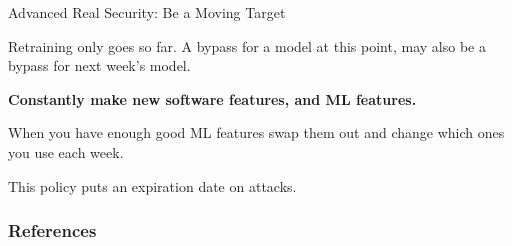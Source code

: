 \documentclass{beamer}
\begin{document}
\begin{frame}{Advanced Real Security: Be a Moving Target}
    \begin{center}
        Retraining only goes so far. A bypass for a model at this point, may also be a bypass for next week's model.
        \vspace{10pt}
        
        \textbf{Constantly make new software features, and ML features.}  
        \vspace{10pt}

        When you have enough good ML features swap them out and change which ones you use each week. 
        \vspace{10pt}
        
        This policy puts an expiration date on attacks. \cite{proofpoint_cve}
    \end{center}
\end{frame}

\begin{frame}[t, allowframebreaks]
\frametitle{References}


\end{frame}
\end{document}
